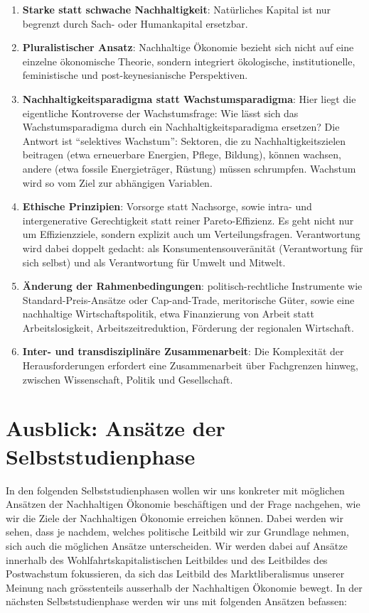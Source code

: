 \documentclass[
  nswissgerman,
  a4paper,
  DIV=11,
  numbers=noendperiod,
  oneside,
  openany]{scrreprt}
\begin{document}
\begin{enumerate}
\def\labelenumi{\arabic{enumi}.}
\item
  \textbf{Starke statt schwache Nachhaltigkeit}: Natürliches Kapital ist
  nur begrenzt durch Sach- oder Humankapital ersetzbar.
\item
  \textbf{Pluralistischer Ansatz}: Nachhaltige Ökonomie bezieht sich
  nicht auf eine einzelne ökonomische Theorie, sondern integriert
  ökologische, institutionelle, feministische und post-keynesianische
  Perspektiven.
\item
  \textbf{Nachhaltigkeitsparadigma statt Wachstumsparadigma}: Hier liegt
  die eigentliche Kontroverse der Wachstumsfrage: Wie lässt sich das
  Wachstumsparadigma durch ein Nachhaltigkeitsparadigma ersetzen? Die
  Antwort ist ``selektives Wachstum'': Sektoren, die zu
  Nachhaltigkeitszielen beitragen (etwa erneuerbare Energien, Pflege,
  Bildung), können wachsen, andere (etwa fossile Energieträger, Rüstung)
  müssen schrumpfen. Wachstum wird so vom Ziel zur abhängigen Variablen.
\item
  \textbf{Ethische Prinzipien}: Vorsorge statt Nachsorge, sowie intra-
  und intergenerative Gerechtigkeit statt reiner Pareto-Effizienz. Es
  geht nicht nur um Effizienzziele, sondern explizit auch um
  Verteilungsfragen. Verantwortung wird dabei doppelt gedacht: als
  Konsumentensouveränität (Verantwortung für sich selbst) und als
  Verantwortung für Umwelt und Mitwelt.
\item
  \textbf{Änderung der Rahmenbedingungen}: politisch-rechtliche
  Instrumente wie Standard-Preis-Ansätze oder Cap-and-Trade,
  meritorische Güter, sowie eine nachhaltige Wirtschaftspolitik, etwa
  Finanzierung von Arbeit statt Arbeitslosigkeit, Arbeitszeitreduktion,
  Förderung der regionalen Wirtschaft.
\item
  \textbf{Inter- und transdisziplinäre Zusammenarbeit}: Die Komplexität
  der Herausforderungen erfordert eine Zusammenarbeit über Fachgrenzen
  hinweg, zwischen Wissenschaft, Politik und Gesellschaft.
\end{enumerate}

\section{Ausblick: Ansätze der
Selbststudienphase}\label{ausblick-ansuxe4tze-der-selbststudienphase}

In den folgenden Selbststudienphasen wollen wir uns konkreter mit
möglichen Ansätzen der Nachhaltigen Ökonomie beschäftigen und der Frage
nachgehen, wie wir die Ziele der Nachhaltigen Ökonomie erreichen können.
Dabei werden wir sehen, dass je nachdem, welches politische Leitbild wir
zur Grundlage nehmen, sich auch die möglichen Ansätze unterscheiden. Wir
werden dabei auf Ansätze innerhalb des Wohlfahrtskapitalistischen
Leitbildes und des Leitbildes des Postwachstum fokussieren, da sich das
Leitbild des Marktliberalismus unserer Meinung nach grösstenteils
ausserhalb der Nachhaltigen Ökonomie bewegt. In der nächsten
Selbststudienphase werden wir uns mit folgenden Ansätzen befassen:
\end{document}
